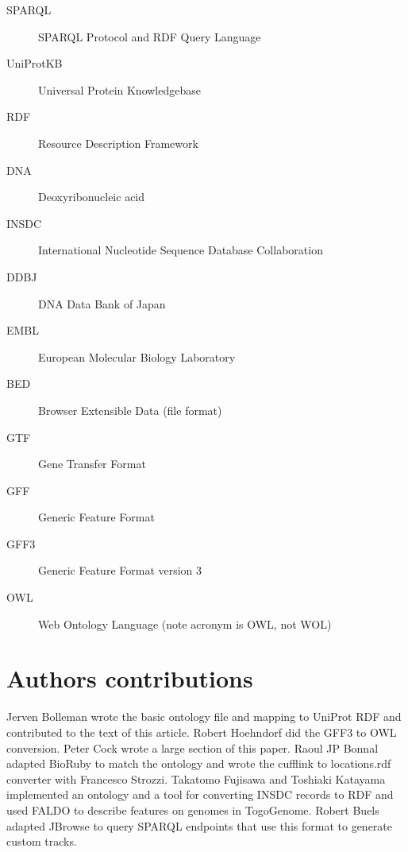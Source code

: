 \documentclass[10pt]{bmc_article}
\newenvironment{bmcformat}{\begin{raggedright}\baselineskip20pt\sloppy\setboolean{publ}{false}}{\end{raggedright}\baselineskip20pt\sloppy}
\begin{document}
\begin{bmcformat}
\begin{description}
\item[SPARQL] SPARQL Protocol and RDF Query Language
\item[UniProtKB] Universal Protein Knowledgebase 
\item[RDF] Resource Description Framework
\item[DNA] Deoxyribonucleic acid
\item[INSDC] International Nucleotide Sequence Database Collaboration
\item[DDBJ] DNA Data Bank of Japan
\item[EMBL] European Molecular Biology Laboratory
\item[BED] Browser Extensible Data (file format)
\item[GTF] Gene Transfer Format
\item[GFF] Generic Feature Format
\item[GFF3] Generic Feature Format version 3
\item[OWL] Web Ontology Language (note acronym is OWL, not WOL)
\end{description}
\bigskip

\section*{Authors contributions}

Jerven Bolleman wrote the basic ontology file and mapping to UniProt RDF and contributed to the text of this article.
Robert Hoehndorf did the GFF3 to OWL conversion.
Peter Cock wrote a large section of this paper.
Raoul JP Bonnal adapted BioRuby to match the ontology and wrote the cufflink to locations.rdf converter with Francesco Strozzi.
Takatomo Fujisawa and Toshiaki Katayama implemented an ontology and a tool for converting INSDC records to RDF and used FALDO to describe features on genomes in TogoGenome.
Robert Buels adapted JBrowse to query SPARQL endpoints that use this format to generate custom tracks. 


\end{bmcformat}
\end{document}

